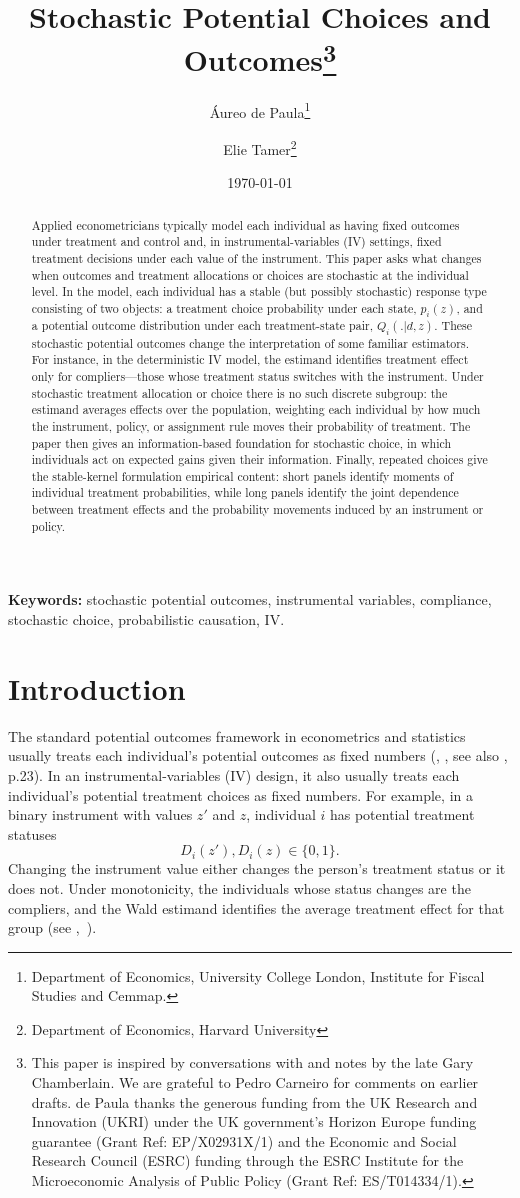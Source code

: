 \documentclass[11pt]{article}
\title{Stochastic Potential Choices and Outcomes\footnote{This paper is inspired by conversations with and notes by the late Gary Chamberlain.  We are grateful to Pedro Carneiro for comments on earlier drafts.  de Paula thanks the generous funding from the UK Research and Innovation (UKRI) under the UK government's Horizon Europe funding guarantee (Grant Ref: EP/X02931X/1) and the Economic and Social Research Council (ESRC) funding through the ESRC Institute for the Microeconomic Analysis of Public Policy (Grant Ref: ES/T014334/1).}}
\author{\'{A}ureo de Paula\thanks{Department of Economics, University College London, Institute for Fiscal Studies and Cemmap. } \and Elie Tamer\thanks{Department of Economics, Harvard University}}
\date{\today}
\newcommand{\1}{\mathbf{1}}
\begin{document}
\maketitle

\begin{abstract}
\noindent Applied econometricians typically model each individual as having fixed outcomes under treatment and control and, in instrumental-variables (IV) settings, fixed treatment decisions under each value of the instrument. This paper asks what changes when outcomes and treatment allocations or choices are stochastic at the individual level. In the model, each individual has a stable (but possibly stochastic) response type consisting of two objects: a treatment choice probability under each state, $p_i(z)$, and a potential outcome distribution under each treatment-state pair, $Q_i(.|d,z)$. These stochastic potential outcomes change the interpretation of some familiar estimators. For instance, in the deterministic IV model, the estimand identifies treatment effect only for compliers—those whose treatment status switches with the instrument. Under stochastic treatment allocation or choice there is no such discrete subgroup: the estimand averages effects over the population, weighting each individual by how much the instrument, policy, or assignment rule moves their probability of treatment.
The paper then gives an information-based foundation for stochastic choice, in which individuals act on expected gains given their information. Finally, repeated choices give the stable-kernel formulation empirical content: short panels identify moments of individual treatment probabilities, while long panels identify the joint dependence between treatment effects and the probability movements induced by an instrument or policy.
\end{abstract}

\noindent\textbf{Keywords:} stochastic potential outcomes, instrumental variables, compliance, stochastic choice, probabilistic causation, IV.

\newpage

\section{Introduction}

The standard potential outcomes framework in econometrics and statistics usually treats each individual's potential outcomes as fixed numbers (\cite{neyman1923}, \cite{rubin1974}, see also \cite{haavelmo1944}, p.23). In an instrumental-variables (IV) design, it also usually treats each individual's potential treatment choices as fixed numbers. For example, in a binary instrument with values $z'$ and $z$, individual $i$ has potential treatment statuses
\[
        D_i(z'),D_i(z)\in\{0,1\}.
\]
Changing the instrument value either changes the person's treatment status or it does not. Under monotonicity, the individuals whose status changes are the compliers, and the Wald estimand identifies the average treatment effect for that group (see \cite{imbensangrist1994},~\cite{angristimbensrubin1996}).
\end{document}
